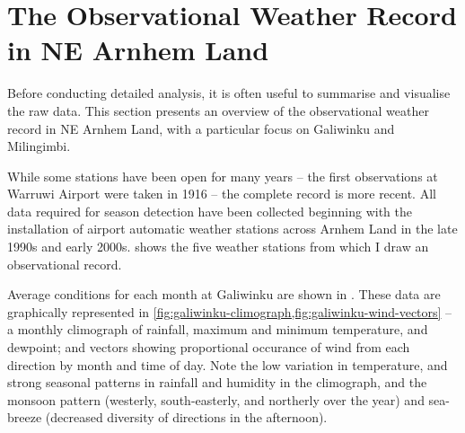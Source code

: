 \section{The Observational Weather Record in NE Arnhem Land}

Before conducting detailed analysis, it is often useful to summarise and
visualise the raw data.  This section presents an overview of the
observational weather record in NE Arnhem Land, with a particular focus
on Galiwinku and Milingimbi.

While some stations have been open for many years -- the first observations
at Warruwi Airport were taken in 1916 -- the complete record is more recent.
All data required for season detection have been collected beginning with
the installation of airport automatic weather stations across Arnhem Land
in the late 1990s and early 2000s.   shows
the five weather stations from which I draw an observational record.

Average conditions for each month at Galiwinku are shown in
.  These data are graphically represented
in \cref{fig:galiwinku-climograph,fig:galiwinku-wind-vectors} -- a monthly
climograph of rainfall, maximum and minimum temperature, and dewpoint; and
vectors showing proportional occurance of wind from each direction by month
and time of day.  Note the low variation in temperature, and strong seasonal
patterns in rainfall and humidity in the climograph, and the monsoon pattern
(westerly, south-easterly, and northerly over the year) and sea-breeze
(decreased diversity of directions in the afternoon).


